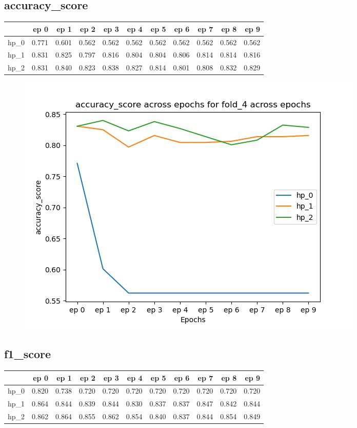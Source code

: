 \documentclass{article}
\begin{document}
\subsection{accuracy\_score}
\begin{tabular}{lrrrrrrrrrr}
\toprule
{} &   ep 0 &   ep 1 &   ep 2 &   ep 3 &   ep 4 &   ep 5 &   ep 6 &   ep 7 &   ep 8 &   ep 9 \\
\midrule
hp\_0 &  0.771 &  0.601 &  0.562 &  0.562 &  0.562 &  0.562 &  0.562 &  0.562 &  0.562 &  0.562 \\
hp\_1 &  0.831 &  0.825 &  0.797 &  0.816 &  0.804 &  0.804 &  0.806 &  0.814 &  0.814 &  0.816 \\
hp\_2 &  0.831 &  0.840 &  0.823 &  0.838 &  0.827 &  0.814 &  0.801 &  0.808 &  0.832 &  0.829 \\
\bottomrule
\end{tabular}

\begin{figure}[H]
\includegraphics[scale = 0.75]{fold_4/accuracy_score}
\end{figure}
\subsection{f1\_score}
\begin{tabular}{lrrrrrrrrrr}
\toprule
{} &   ep 0 &   ep 1 &   ep 2 &   ep 3 &   ep 4 &   ep 5 &   ep 6 &   ep 7 &   ep 8 &   ep 9 \\
\midrule
hp\_0 &  0.820 &  0.738 &  0.720 &  0.720 &  0.720 &  0.720 &  0.720 &  0.720 &  0.720 &  0.720 \\
hp\_1 &  0.864 &  0.844 &  0.839 &  0.844 &  0.830 &  0.837 &  0.837 &  0.847 &  0.842 &  0.844 \\
hp\_2 &  0.862 &  0.864 &  0.855 &  0.862 &  0.854 &  0.840 &  0.837 &  0.844 &  0.854 &  0.849 \\
\bottomrule
\end{tabular}
\end{document}
